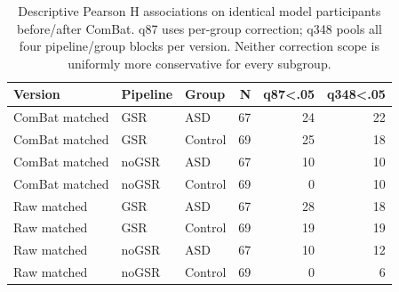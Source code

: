 \begin{table}[htbp]
\centering\small
\caption{Descriptive Pearson H associations on identical model participants before/after ComBat. q87 uses per-group correction; q348 pools all four pipeline/group blocks per version. Neither correction scope is uniformly more conservative for every subgroup.}\label{tab:SHmatched}
\begin{tabular}{lllrrr}
\toprule
Version & Pipeline & Group & N & q87<.05 & q348<.05 \\
\midrule
ComBat matched & GSR & ASD & 67 & 24 & 22 \\
ComBat matched & GSR & Control & 69 & 25 & 18 \\
ComBat matched & noGSR & ASD & 67 & 10 & 10 \\
ComBat matched & noGSR & Control & 69 & 0 & 10 \\
Raw matched & GSR & ASD & 67 & 28 & 18 \\
Raw matched & GSR & Control & 69 & 19 & 19 \\
Raw matched & noGSR & ASD & 67 & 10 & 12 \\
Raw matched & noGSR & Control & 69 & 0 & 6 \\
\bottomrule
\end{tabular}
\end{table}
